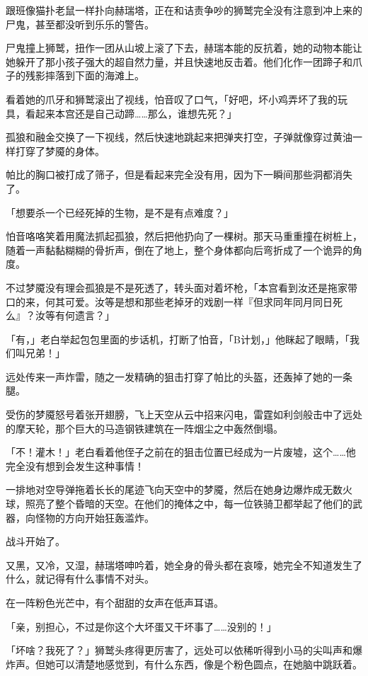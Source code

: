 跟班像猫扑老鼠一样扑向赫瑞塔，正在和诘责争吵的狮鹫完全没有注意到冲上来的尸鬼，甚至都没听到乐乐的警告。

尸鬼撞上狮鹫，扭作一团从山坡上滚了下去，赫瑞本能的反抗着，她的动物本能让她躲开了那小孩子强大的超自然力量，并且快速地反击着。他们化作一团蹄子和爪子的残影摔落到下面的海滩上。

看着她的爪牙和狮鹫滚出了视线，怕音叹了口气，「好吧，坏小鸡弄坏了我的玩具，看起来本宫还是自己动蹄……那么，谁想先死？」

孤狼和融金交换了一下视线，然后快速地跳起来把弹夹打空，子弹就像穿过黄油一样打穿了梦魇的身体。

帕比的胸口被打成了筛子，但是看起来完全没有用，因为下一瞬间那些洞都消失了。

「想要杀一个已经死掉的生物，是不是有点难度？」

怕音咯咯笑着用魔法抓起孤狼，然后把他扔向了一棵树。那天马重重撞在树桩上，随着一声黏黏糊糊的骨折声，倒在了地上，整个身体都向后弯折成了一个诡异的角度。

不过梦魇没有理会孤狼是不是死透了，转头面对着坏枪，「本宫看到汝还是拖家带口的来，何其可爱。汝等是想和那些老掉牙的戏剧一样『但求同年同月同日死么』？汝等有何遗言？」

「有，」老白举起包包里面的步话机，打断了怕音，「B计划，」他眯起了眼睛，「我们叫兄弟！」

远处传来一声炸雷，随之一发精确的狙击打穿了帕比的头盔，还轰掉了她的一条腿。

受伤的梦魇怒号着张开翅膀，飞上天空从云中招来闪电，雷霆如利剑般击中了远处的摩天轮，那个巨大的马造钢铁建筑在一阵烟尘之中轰然倒塌。

「不！灌木！」老白看着他侄子之前在的狙击位置已经成为一片废墟，这个……他完全没有想到会发生这种事情！

一排地对空导弹拖着长长的尾迹飞向天空中的梦魇，然后在她身边爆炸成无数火球，照亮了整个昏暗的天空。在他们的掩体之中，每一位铁骑卫都举起了他们的武器，向怪物的方向开始狂轰滥炸。

战斗开始了。

\horizonline

又黑，又冷，又湿，赫瑞塔呻吟着，她全身的骨头都在哀嚎，她完全不知道发生了什么，就记得有什么事情不对头。

在一阵粉色光芒中，有个甜甜的女声在低声耳语。

「亲，别担心，不过是你这个大坏蛋又干坏事了……没别的！」

「坏啥？我死了？」狮鹫头疼得更厉害了，远处可以依稀听得到小马的尖叫声和爆炸声。但她可以清楚地感觉到，有什么东西，像是个粉色圆点，在她脑中跳跃着。

